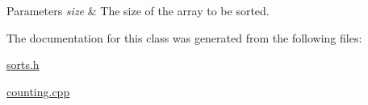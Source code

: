 \begin{DoxyParams}{Parameters}
{\em size} & The size of the array to be sorted. \\
\hline
\end{DoxyParams}


The documentation for this class was generated from the following files\-:\begin{DoxyCompactItemize}
\item 
\hyperlink{sorts_8h}{sorts.\-h}\item 
\hyperlink{counting_8cpp}{counting.\-cpp}\end{DoxyCompactItemize}
